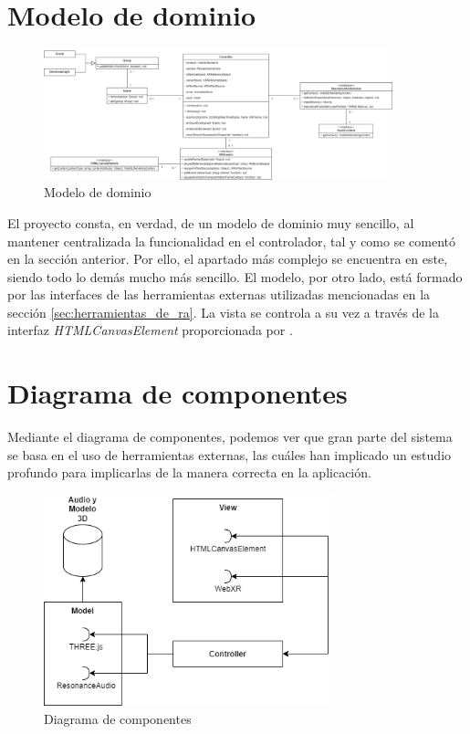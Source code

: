 \documentclass{subfiles}
\begin{document}
        \section{Modelo de dominio}
        \label{sec:modelo_de_dominio}
\begin{figure}[ht]
\centering
\includegraphics[width=0.9\textwidth]{img/analisis_modelo_de_dominio.png}
\caption{Modelo de dominio}
\label{fig:analisis_modelo_de_dominio}
\end{figure}
        El proyecto \titlename consta, en verdad, de un modelo de dominio muy sencillo, al mantener centralizada la funcionalidad en el controlador, tal y como se comentó en la sección anterior. Por ello, el apartado más complejo se encuentra en este, siendo todo lo demás mucho más sencillo. El modelo, por otro lado, está formado por las interfaces de las herramientas externas utilizadas mencionadas en la sección \ref{sec:herramientas_de_ra}. La vista se controla a su vez a través de la interfaz \textit{HTMLCanvasElement} proporcionada por \js.



        \section{Diagrama de componentes}
        \label{sec:diagrama_de_componentes}

Mediante el diagrama de componentes, podemos ver que gran parte del sistema se basa en el uso de herramientas externas, las cuáles han implicado un estudio profundo para implicarlas de la manera correcta en la aplicación.

\begin{figure}[ht]
\centering
\includegraphics[width=0.75\textwidth]{img/analisis_diagrama_de_componentes.png}
\caption{Diagrama de componentes}
\label{fig:analisis_diagrama_de_componentes}
\end{figure}
\end{document}
